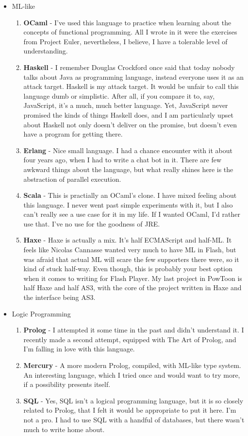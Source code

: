 \documentclass[oneside]{memoir}
\begin{document}
\begin{itemize}
\item ML-like
\begin{enumerate}
\item \textbf{OCaml} - I've used this language to practice when learning about the
concepts of functional programming.  All I wrote in it were the exercises
from Project Euler, nevertheless, I believe, I have a tolerable level of
understanding.
\item \textbf{Haskell} - I remember Douglas Crockford once said that today nobody
talks about Java as programming language, instead everyone uses it as an
attack target.  Haskell is my attack target.  It would be unfair to call
this language dumb or simplistic.  After all, if you compare it to, say,
JavaScript, it's a much, much better language.  Yet, JavaScript never
promised the kinds of things Haskell does, and I am particularly upset
about Haskell not only doesn't deliver on the promise, but doesn't even
have a program for getting there.
\item \textbf{Erlang} - Nice small language.  I had a chance encounter with it about
four years ago, when I had to write a chat bot in it.  There are few
awkward things about the language, but what really shines here is the
abstraction of parallel execution.
\item \textbf{Scala} - This is practially an OCaml's clone.  I have mixed feeling about
this language.  I never went past simple experiments with it, but I also
can't really see a use case for it in my life.  If I wanted OCaml, I'd
rather use that.  I've no use for the goodness of JRE.
\item \textbf{Haxe} - Haxe is actually a mix.  It's half ECMAScript and half-ML.  It
feels like Nicolas Cannasse wanted very much to have ML in Flash, but
was afraid that actual ML will scare the few supporters there were,
so it kind of stuck half-way.  Even though, this is probably your best
option when it comes to writing for Flash Player.  My last project
in PowToon is half Haxe and half AS3, with the core of the project
written in Haxe and the interface being AS3.
\end{enumerate}

\item Logic Programming
\begin{enumerate}
\item \textbf{Prolog} - I attempted it some time in the past and didn't understand it.
I recently made a second attempt, equipped with The Art of Prolog, and
I'm falling in love with this language.
\item \textbf{Mercury} - A more modern Prolog, compiled, with ML-like type system.
An interesting language, which I tried once and would want to try more,
if a possibility presents itself.
\item \textbf{SQL} - Yes, SQL isn't a logical programming language, but it is so 
closely related to Prolog, that I felt it would be appropriate to put it
here.  I'm not a pro.  I had to use SQL with a handful of databases,
but there wasn't much to write home about.
\end{enumerate}


\end{itemize}
\end{document}

